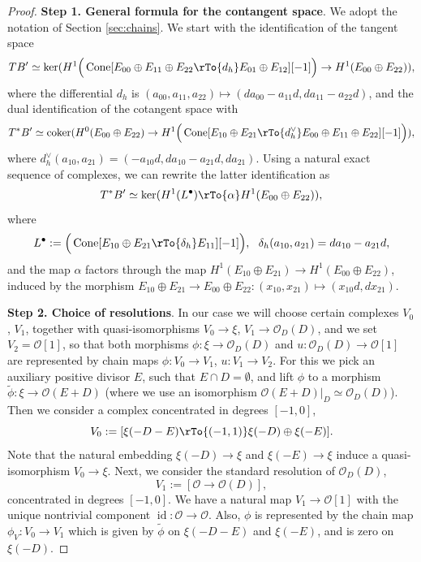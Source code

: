 \documentclass[reqno]{amsart}
\theoremstyle{definition}
\theoremstyle{remark}
\newcommand{\wt}{\widetilde}
\newcommand{\coker}{\operatorname{coker}}
\newcommand{\OO}{{\mathcal O}}
\newcommand{\de}{\delta}
\renewcommand{\a}{\alpha}
\newcommand{\id}{\operatorname{id}}
\newcommand{\Cone}{\operatorname{Cone}}
\numberwithin{equation}{section}
\begin{document}
\begin{proof}
\noindent
{\bf Step 1. General formula for the contangent space}.
We adopt the notation of Section \ref{sec:chains}.
We start with the identification of the tangent space
$$TB'\simeq \ker(H^1\Big(\Cone[E_{00}\oplus E_{11}\oplus E_{22}\rTo{d_h} E_{01}\oplus E_{12}][-1]\Big)\to H^1(E_{00}\oplus E_{22})),$$
where the differential $d_h$ is $(a_{00},a_{11},a_{22})\mapsto (da_{00}-a_{11}d,da_{11}-a_{22}d)$,
and the dual identification of the cotangent space with
\begin{equation}\label{T*B-first-identification}
T^*B'\simeq \coker(H^0(E_{00}\oplus E_{22})\to H^1\Big(\Cone[E_{10}\oplus E_{21}\rTo{d_h^\vee} E_{00}\oplus E_{11}\oplus E_{22}][-1]\Big)),
\end{equation}
where $d_h^\vee(a_{10},a_{21})=(-a_{10}d,da_{10}-a_{21}d,da_{21})$.
Using a natural exact sequence of complexes, we can rewrite the latter identification as
\begin{equation}\label{alpha-map-eq}
T^*B'\simeq \ker(H^1(L^\bullet)\rTo{\a} H^1(E_{00}\oplus E_{22})),
\end{equation}
where 
$$L^\bullet:=\Big(\Cone[E_{10}\oplus E_{21}\rTo{\de_h} E_{11}][-1]\Big), \ \ \de_h(a_{10},a_{21})=da_{10}-a_{21}d,$$ 
and
the map $\a$ factors through the map $H^1(E_{10}\oplus E_{21})\to H^1(E_{00}\oplus E_{22})$, induced
by the morphism $E_{10}\oplus E_{21}\to E_{00}\oplus E_{22}: (x_{10},x_{21})\mapsto (x_{10}d,dx_{21})$.

\noindent
{\bf Step 2. Choice of resolutions}.
In our case we will choose certain complexes $V_0$, $V_1$, together with quasi-isomorphisms $V_0\to \xi$, $V_1\to \OO_D(D)$, and we set $V_2=\OO[1]$,
so that both morphisms $\phi:\xi\to \OO_D(D)$ and $u:\OO_D(D)\to \OO[1]$ are represented by chain maps $\phi:V_0\to V_1$, $u:V_1\to V_2$.
For this we pick an auxiliary positive divisor $E$, such that $E\cap D=\emptyset$, and lift $\phi$ to a morphism $\wt{\phi}:\xi\to \OO(E+D)$ (where we use
an isomorphism $\OO(E+D)|_D\simeq \OO_D(D)$). Then we consider a complex concentrated in degrees $[-1,0]$,
$$V_0:=[\xi(-D-E)\rTo{(-1,1)} \xi(-D)\oplus \xi(-E)].$$
Note that the natural embedding $\xi(-D)\to \xi$ and $\xi(-E)\to \xi$ induce a quasi-isomorphism $V_0\to \xi$. Next, we consider the standard resolution of $\OO_D(D)$,
$$V_1:=[\OO\to \OO(D)],$$
concentrated in degrees $[-1,0]$. We have a natural map $V_1\to \OO[1]$ with the unique nontrivial component $\id:\OO\to \OO$.
Also, $\phi$ is represented by the chain map $\phi_V:V_0\to V_1$ which is given by $\wt{\phi}$ on $\xi(-D-E)$ and $\xi(-E)$, and is zero on $\xi(-D)$.


\end{proof}
\end{document}
